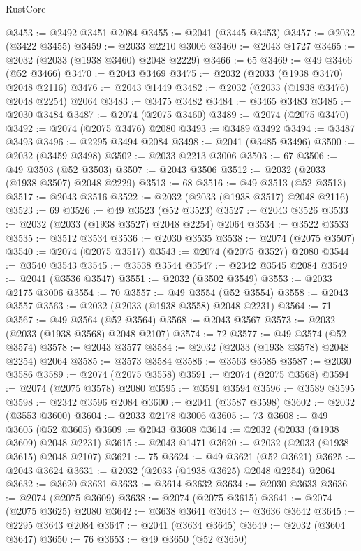 \begin{lexlean}{RustCore}
\begin{coremodule}
@3453 := @2492 @3451 @2084
@3455 := @2041 (@3445 @3453)
@3457 := @2032 (@3422 @3455)
@3459 := @2033 @2210 @3006
@3460 := @2043 @1727
@3465 := @2032 (@2033 (@1938 @3460) @2048 @2229)
@3466 := 65
@3469 := @49 @3466 (@52 @3466)
@3470 := @2043 @3469
@3475 := @2032 (@2033 (@1938 @3470) @2048 @2116)
@3476 := @2043 @1449
@3482 := @2032 (@2033 (@1938 @3476) @2048 @2254) @2064
@3483 := @3475 @3482
@3484 := @3465 @3483
@3485 := @2030 @3484
@3487 := @2074 (@2075 @3460)
@3489 := @2074 (@2075 @3470)
@3492 := @2074 (@2075 @3476) @2080
@3493 := @3489 @3492
@3494 := @3487 @3493
@3496 := @2295 @3494 @2084
@3498 := @2041 (@3485 @3496)
@3500 := @2032 (@3459 @3498)
@3502 := @2033 @2213 @3006
@3503 := 67
@3506 := @49 @3503 (@52 @3503)
@3507 := @2043 @3506
@3512 := @2032 (@2033 (@1938 @3507) @2048 @2229)
@3513 := 68
@3516 := @49 @3513 (@52 @3513)
@3517 := @2043 @3516
@3522 := @2032 (@2033 (@1938 @3517) @2048 @2116)
@3523 := 69
@3526 := @49 @3523 (@52 @3523)
@3527 := @2043 @3526
@3533 := @2032 (@2033 (@1938 @3527) @2048 @2254) @2064
@3534 := @3522 @3533
@3535 := @3512 @3534
@3536 := @2030 @3535
@3538 := @2074 (@2075 @3507)
@3540 := @2074 (@2075 @3517)
@3543 := @2074 (@2075 @3527) @2080
@3544 := @3540 @3543
@3545 := @3538 @3544
@3547 := @2342 @3545 @2084
@3549 := @2041 (@3536 @3547)
@3551 := @2032 (@3502 @3549)
@3553 := @2033 @2175 @3006
@3554 := 70
@3557 := @49 @3554 (@52 @3554)
@3558 := @2043 @3557
@3563 := @2032 (@2033 (@1938 @3558) @2048 @2231)
@3564 := 71
@3567 := @49 @3564 (@52 @3564)
@3568 := @2043 @3567
@3573 := @2032 (@2033 (@1938 @3568) @2048 @2107)
@3574 := 72
@3577 := @49 @3574 (@52 @3574)
@3578 := @2043 @3577
@3584 := @2032 (@2033 (@1938 @3578) @2048 @2254) @2064
@3585 := @3573 @3584
@3586 := @3563 @3585
@3587 := @2030 @3586
@3589 := @2074 (@2075 @3558)
@3591 := @2074 (@2075 @3568)
@3594 := @2074 (@2075 @3578) @2080
@3595 := @3591 @3594
@3596 := @3589 @3595
@3598 := @2342 @3596 @2084
@3600 := @2041 (@3587 @3598)
@3602 := @2032 (@3553 @3600)
@3604 := @2033 @2178 @3006
@3605 := 73
@3608 := @49 @3605 (@52 @3605)
@3609 := @2043 @3608
@3614 := @2032 (@2033 (@1938 @3609) @2048 @2231)
@3615 := @2043 @1471
@3620 := @2032 (@2033 (@1938 @3615) @2048 @2107)
@3621 := 75
@3624 := @49 @3621 (@52 @3621)
@3625 := @2043 @3624
@3631 := @2032 (@2033 (@1938 @3625) @2048 @2254) @2064
@3632 := @3620 @3631
@3633 := @3614 @3632
@3634 := @2030 @3633
@3636 := @2074 (@2075 @3609)
@3638 := @2074 (@2075 @3615)
@3641 := @2074 (@2075 @3625) @2080
@3642 := @3638 @3641
@3643 := @3636 @3642
@3645 := @2295 @3643 @2084
@3647 := @2041 (@3634 @3645)
@3649 := @2032 (@3604 @3647)
@3650 := 76
@3653 := @49 @3650 (@52 @3650)

\end{coremodule}
\end{lexlean}
